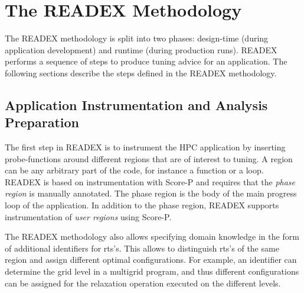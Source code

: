 \section{The READEX Methodology} \label{sec:methodology}

The READEX methodology is split into two phases: design-time (during application development) and runtime (during production runs). READEX performs a sequence of steps to produce tuning advice for an application. The following sections describe the steps defined in the READEX methodology.


\subsection{Application Instrumentation and Analysis Preparation}
\label{sec:application_instrumentation}
The first step in READEX is to instrument the HPC application by inserting probe-functions around different regions that are of interest to tuning. A region can be any arbitrary part of the code, for instance a function or a loop. READEX is based on instrumentation with Score-P and requires that the \textit{phase region} is manually annotated. The phase region is the body of the main progress loop of the application. In addition to the phase region, READEX supports instrumentation of \textit{user regions} using Score-P.

The READEX methodology also allows specifying domain knowledge in the form of additional identifiers for rts's. This allows to distinguish rts's of the same region and assign different optimal configurations. For example, an identifier can determine the grid level in a multigrid program, and thus different configurations can be assigned for the relaxation operation executed on the different levels. 

